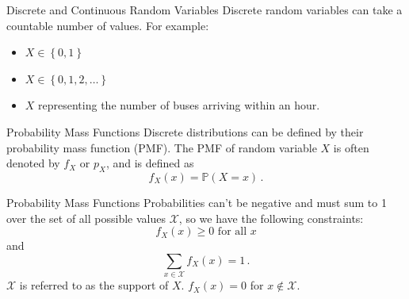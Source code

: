 \documentclass[10pt]{beamer}
\begin{document}
\begin{frame}[fragile]{Discrete and Continuous Random Variables}
Discrete random variables can take a countable number of values. For example:
\begin{itemize}
    \item \(X \in \left\{0, 1\right\}\)
    \item \(X \in \left\{0, 1, 2, \dots\right\}\)
    \item \(X\) representing the number of buses arriving within an hour.
\end{itemize}

\end{frame}

\begin{frame}[fragile]{Probability Mass Functions}
Discrete distributions can be defined by their probability mass function (PMF). The PMF of random variable \(X\) is often denoted by \(f_X\) or \(p_X\), and is defined as
\begin{equation*}
    f_X\left(x\right) = \mathbb{P}\left(X = x\right)\,.
\end{equation*}
\end{frame}

\begin{frame}[fragile]{Probability Mass Functions}
Probabilities can't be negative and must sum to 1 over the set of all possible values \(\mathcal{X}\), so we have the following constraints:
\begin{equation*}
    f_X\left(x\right) \geq 0 \text{ for all } x
\end{equation*}
and
\begin{equation*}
    \sum_{x \in \mathcal{X}} f_X\left(x\right) = 1\,.
\end{equation*}
\(\mathcal{X}\) is referred to as the support of \(X\). \(f_X\left(x\right) = 0\) for \(x \notin \mathcal{X}\).
\end{frame}
\end{document}
